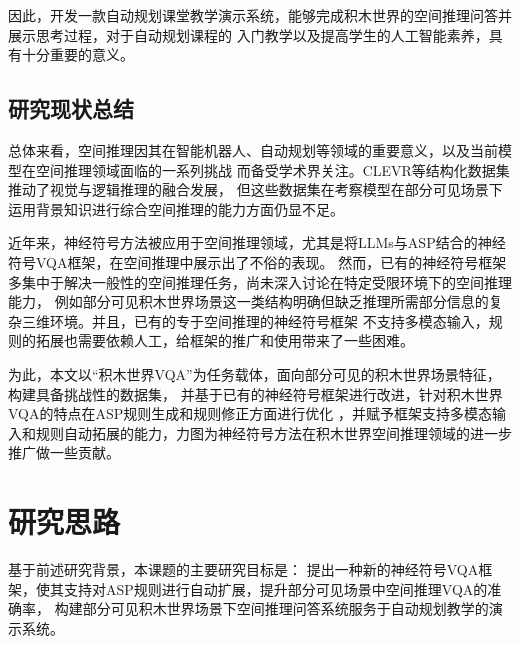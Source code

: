 因此，开发一款自动规划课堂教学演示系统，能够完成积木世界的空间推理问答并展示思考过程，对于自动规划课程的
入门教学以及提高学生的人工智能素养，具有十分重要的意义。
\subsection{研究现状总结}
总体来看，空间推理因其在智能机器人、自动规划等领域的重要意义，以及当前模型在空间推理领域面临的一系列挑战
而备受学术界关注。CLEVR等结构化数据集推动了视觉与逻辑推理的融合发展，
但这些数据集在考察模型在部分可见场景下运用背景知识进行综合空间推理的能力方面仍显不足。

近年来，神经符号方法被应用于空间推理领域，尤其是将LLMs与ASP结合的神经符号VQA框架，在空间推理中展示出了不俗的表现。
然而，已有的神经符号框架多集中于解决一般性的空间推理任务，尚未深入讨论在特定受限环境下的空间推理能力，
例如部分可见积木世界场景这一类结构明确但缺乏推理所需部分信息的复杂三维环境。并且，已有的专于空间推理的神经符号框架
\cite{wang2024dspy}不支持多模态输入，规则的拓展也需要依赖人工，给框架的推广和使用带来了一些困难。

为此，本文以“积木世界VQA”为任务载体，面向部分可见的积木世界场景特征，构建具备挑战性的数据集，
并基于已有的神经符号框架进行改进，针对积木世界VQA的特点在ASP规则生成和规则修正方面进行优化
，并赋予框架支持多模态输入和规则自动拓展的能力，力图为神经符号方法在积木世界空间推理领域的进一步推广做一些贡献。
\section{研究思路}
基于前述研究背景，本课题的主要研究目标是：
提出一种新的神经符号VQA框架，使其支持对ASP规则进行自动扩展，提升部分可见场景中空间推理VQA的准确率，
构建部分可见积木世界场景下空间推理问答系统服务于自动规划教学的演示系统。

